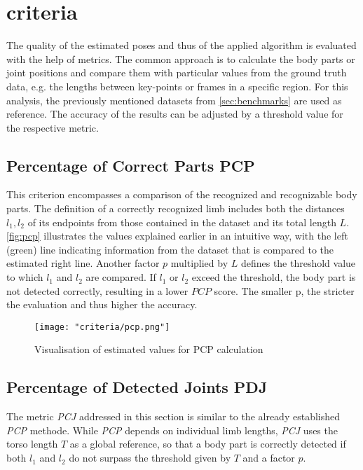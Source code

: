 \section{criteria}
The quality of the estimated poses and thus of the applied algorithm is evaluated with the help of metrics. The common approach is to calculate the body parts or joint positions and compare them with particular values from the ground truth data, e.g. the lengths between key-points or frames in a specific region. For this analysis, the previously mentioned datasets from \autoref{sec:benchmarks} are used as reference. The accuracy of the results can be adjusted by a threshold value for the respective metric.

\subsection{Percentage of Correct Parts PCP}
\label{sec:pcp}
This criterion encompasses a comparison of the recognized and recognizable body parts. The definition of a correctly recognized limb includes both the distances $l_{1}, l_{2}$ of its endpoints from those contained in the dataset and its total length $L$. \autoref{fig:pcp} illustrates the values explained earlier in an intuitive way, with the left (green) line indicating information from the dataset that is compared to the estimated right line. Another factor $p$ multiplied by $L$ defines the threshold value to which $l_{1}$ and $l_{2}$ are compared. If $l_{1}$ or $l_{2}$ exceed the threshold, the body part is not detected correctly, resulting in a lower $PCP$ score.
The smaller p, the stricter the evaluation and thus higher the accuracy.\cite{pcp}

\begin{figure}[h]
\centering
\texttt{[image: "criteria/pcp.png"]}
\caption{Visualisation of estimated values for PCP calculation}
\label{fig:pcp}
\end{figure}

\subsection{Percentage of Detected Joints PDJ}
\label{sec:pdj}
The metric \emph{PCJ} addressed in this section is similar to the already established \emph{PCP} methode. While \emph{PCP} depends on individual limb lengths, \emph{PCJ} uses the torso length $T$ as a global reference, so that a body part is correctly detected if both $l_{1}$ and $l_{2}$ do not surpass the threshold given by $T$ and a factor $p$. \cite{pdj}

